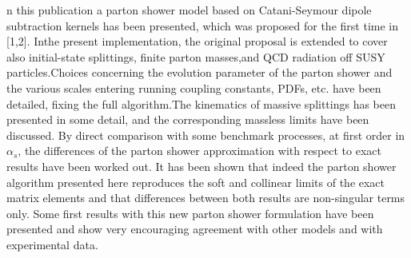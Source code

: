 n this publication a parton shower model based on Catani-Seymour dipole subtraction kernels has been presented, which was proposed for the first time in [1,2]. Inthe present implementation, the original proposal is extended to cover also initial-state splittings, finite parton masses,and QCD radiation off SUSY particles.Choices concerning the evolution parameter of the parton shower and the various scales entering running coupling constants, PDFs, etc. have been detailed, fixing the full algorithm.The kinematics of massive splittings has been presented in some detail, and the corresponding massless limits have been discussed. By direct comparison with some benchmark processes,
at first order in $ \alpha_s $, the differences of the parton shower approximation with respect to exact results have been worked out.  It has been shown that indeed the parton shower algorithm presented here reproduces the soft and collinear limits of the exact matrix elements and that differences between both results are non-singular terms only. Some first results with this new parton shower formulation have been presented and show very encouraging agreement with other models and with experimental data.